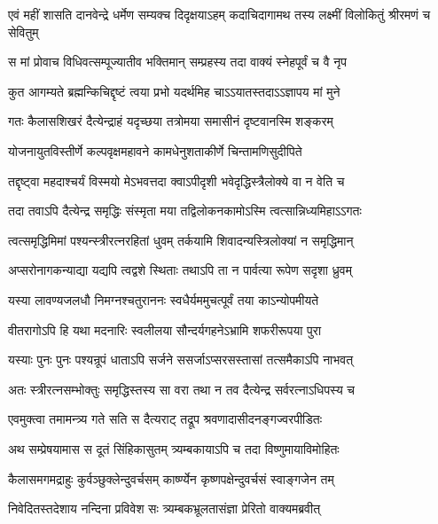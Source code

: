 \twolineshloka
{एवं महीं शासति दानवेन्द्रे धर्मेण सम्यक्च दिदृक्षयाऽहम्}
{कदाचिदागामथ तस्य लक्ष्मीं विलोकितुं श्रीरमणं च सेवितुम्} %





\twolineshloka
{स मां प्रोवाच विधिवत्सम्पूज्यातीव भक्तिमान्}
{सम्प्रहस्य तदा वाक्यं स्नेहपूर्वं च वै नृप} %

\twolineshloka
{कुत आगम्यते ब्रह्मन्किचिद्दृष्टं त्वया प्रभो}
{यदर्थमिह चाऽऽयातस्तदाऽऽज्ञापय मां मुने} %


\twolineshloka
{गतः कैलासशिखरं दैत्येन्द्राहं यदृच्छया}
{तत्रोमया समासीनं दृष्टवानस्मि शङ्करम्} %

\twolineshloka
{योजनायुतविस्तीर्णे कल्पवृक्षमहावने}
{कामधेनुशताकीर्णे चिन्तामणिसुदीपिते} %

\twolineshloka
{तद्दृष्ट्वा महदाश्चर्यं विस्मयो मेऽभवत्तदा}
{क्वाऽपीदृशी भवेदृद्धिस्त्रैलोक्ये वा न वेति च} %

\twolineshloka
{तदा तवाऽपि दैत्येन्द्र समृद्धिः संस्मृता मया}
{तद्विलोकनकामोऽस्मि त्वत्सान्निध्यमिहाऽऽगतः} %

\twolineshloka
{त्वत्समृद्धिमिमां पश्यन्स्त्रीरत्नरहितां धुवम्}
{तर्कयामि शिवादन्यस्त्रिलोक्यां न समृद्धिमान्} %

\twolineshloka
{अप्सरोनागकन्याद्या यद्यपि त्वद्वशे स्थिताः}
{तथाऽपि ता न पार्वत्या रूपेण सदृशा ध्रुवम्} %

\twolineshloka
{यस्या लावण्यजलधौ निमग्नश्चतुराननः}
{स्वधैर्यममुचत्पूर्वं तया काऽन्योपमीयते} %

\twolineshloka
{वीतरागोऽपि हि यथा मदनारिः स्वलीलया}
{सौन्दर्यगहनेऽभ्रामि शफरीरूपया पुरा} %

\twolineshloka
{यस्याः पुनः पुनः पश्यन्रूपं धाताऽपि सर्जने}
{ससर्जाऽप्सरसस्तासां तत्समैकाऽपि नाभवत्} %

\twolineshloka
{अतः स्त्रीरत्नसम्भोक्तुः समृद्धिस्तस्य सा वरा}
{तथा न तव दैत्येन्द्र सर्वरत्नाऽधिपस्य च} %

\twolineshloka
{एवमुक्त्वा तमामन्त्र्य गते सति स दैत्यराट्}
{तद्रूप श्रवणादासीदनङ्गज्वरपीडितः} %

\twolineshloka
{अथ सम्प्रेषयामास स दूतं सिंहिकासुतम्}
{त्र्यम्बकायाऽपि च तदा विष्णुमायाविमोहितः} %

\twolineshloka
{कैलासमगमद्राहुः कुर्वञ्छुक्लेन्दुवर्चसम्}
{कार्ष्ण्येन कृष्णपक्षेन्दुवर्चसं स्वाङ्गजेन तम्} %

\twolineshloka
{निवेदितस्तदेशाय नन्दिना प्रविवेश सः}
{त्र्यम्बकभ्रूलतासंज्ञा प्रेरितो वाक्यमब्रवीत्} %


